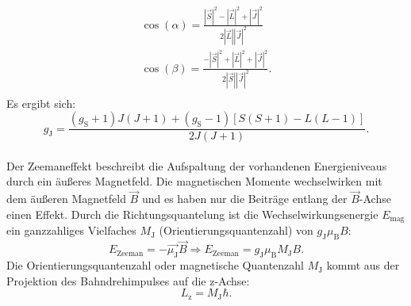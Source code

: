 \begin{align*}
  \cos{(\alpha)} = \frac{ |\vec{S}|^2 - |\vec{L}|^2 + |\vec{J}|^2}{2 |\vec{L}||\vec{J}|^2} \\%
  \cos{(\beta)}  = \frac{-|\vec{S}|^2 + |\vec{L}|^2 + |\vec{J}|^2}{2 |\vec{S}||\vec{J}|^2}.\\%
\end{align*}
Es ergibt sich:
\begin{equation}
  g_{\text{J}}= \frac{\left(g_{\text{S}} +1 \right)J\left(J+1\right) + \left(g_{\text{S}}-1\right) \left[ S\left(S+1\right)-L\left(L-1\right) \right]   }{2J\left(J+1\right)}.
\label{eqn:landej}
\end{equation}
%
%
\\Der Zeemaneffekt beschreibt die Aufspaltung der vorhandenen Energieniveaus durch ein äußeres Magnetfeld.
Die magnetischen Momente wechselwirken mit dem äußeren Magnetfeld $\vec{B}$ und es haben nur die Beiträge entlang der $\vec{B}$-Achse einen Effekt.
Durch die Richtungsquantelung ist die Wechselwirkungsenergie $E_{\text{mag}}$ ein ganzzahliges Vielfaches $M_{\text{J}}$ (Orientierungsquantenzahl) von $g_{\text{J}} \mu_{\text{B}} B$:
\begin{equation}
  E_{\text{Zeeman}} = -\vec{\mu_{\text{J}}} \vec{B} \Rightarrow E_{\text{Zeeman}} = g_{\text{J}} \mu_{\text{B}} M_{\text{J}} B.
  \label{eqn:zeeman}
\end{equation}
Die Orientierungsquantenzahl oder magnetische Quantenzahl $M_{\text{J}}$ kommt aus der Projektion des Bahndrehimpulses auf die z-Achse:
\begin{equation*}
  L_\text{z}= M_{\text{J}} \hbar.
\end{equation*}
